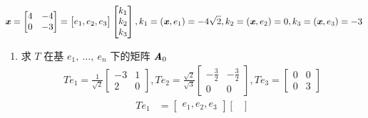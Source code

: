 \begin{solution}
\begin{enumerate}
\begin{align*}
                            \end{align*}
                            \begin{align*}
                                \textbf{\textit{x}} = \begin{bmatrix}
                                    4 & -4 \\ 0 & -3
                                \end{bmatrix} = \begin{bmatrix}
                                    e_1, e_2, e_3
                                \end{bmatrix}\begin{bmatrix}
                                    k_1 \\ k_2 \\ k_3
                                \end{bmatrix}, k_1 = (\textbf{\textit{x}},e_1) = -4\sqrt{2}, k_2 = (\textbf{\textit{x}},e_2) = 0, k_3 = (\textbf{\textit{x}},e_3) = -3
                            \end{align*}
                    \begin{enumerate}
                        \item 求 $T$ 在基 $e_1, \ \dots, \ e_n$ 下的矩阵 $\textbf{\textit{A}}_0$
                            \begin{align*}
                                Te_1 = \frac{1}{\sqrt{2}}\begin{bmatrix}
                                    -3 & 1 \\ 2 & 0
                                \end{bmatrix}, Te_2 = \frac{\sqrt{2}}{\sqrt{3}}\begin{bmatrix}
                                    -\frac{3}{2} & -\frac{3}{2} \\ 0 & 0
                                \end{bmatrix}, Te_3 = \begin{bmatrix}
                                    0 & 0 \\ 0 & 3
                                \end{bmatrix}
                            \end{align*}
                            \begin{align*}
                                Te_1 &= \begin{bmatrix}
                                    e_1, e_2, e_3
                                \end{bmatrix}\begin{bmatrix}

\end{bmatrix}
\end{align*}
\end{enumerate}
\end{enumerate}
\end{solution}
